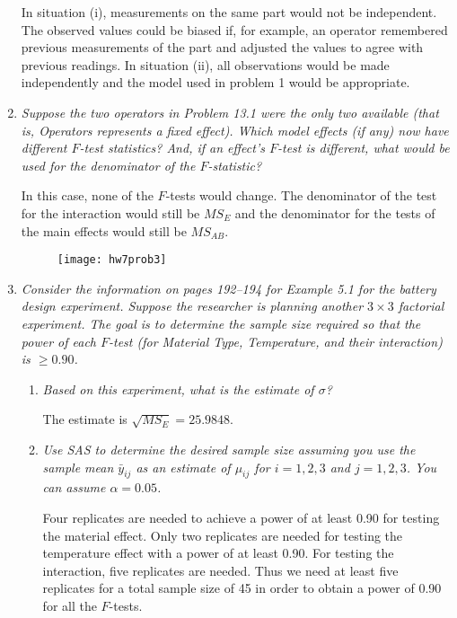 \documentclass[11pt]{article}
\begin{document}
\begin{enumerate}
In situation (i), measurements on the same part would not be independent.
The observed values could be biased if, for example, an operator remembered
previous measurements of the part and adjusted the values to agree with
previous readings. In situation (ii), all observations would be made
independently and the model used in problem 1 would be appropriate.

\item %
{\it Suppose the two operators in Problem 13.1 were the only two available
(that is, Operators represents a fixed effect). Which model effects (if any)
now have different \(F\)-test statistics? And, if an effect's \(F\)-test is
different, what would be used for the denominator of the \(F\)-statistic?}

In this case, none of the \(F\)-tests would change. The denominator of the
test for the interaction would still be \(MS_E\) and the denominator for the
tests of the main effects would still be \(MS_{AB}\).

\begin{figure}[H]\centering
\texttt{[image: hw7prob3]}
\end{figure}

\item %
{\it Consider the information on pages 192--194 for Example 5.1 for the battery
design experiment. Suppose the researcher is planning another \(3\times 3\)
factorial experiment. The goal is to determine the sample size required so
that the power of each \(F\)-test (for Material Type, Temperature, and their
interaction) is \(\geq 0.90\).}

\begin{enumerate}

\item %
{\it Based on this experiment, what is the estimate of \(\sigma\)?}

The estimate is \(\sqrt{MS_E}=25.9848\).

\item %
{\it Use SAS to determine the desired sample size assuming you use the sample
mean \(\bar{y}_{ij}\) as an estimate of \(\mu_{ij}\) for \(i=1,2,3\) and
\(j=1,2,3\). You can assume \(\alpha=0.05\).}

Four replicates are needed to achieve a power of at least 0.90 for testing the
material effect. Only two replicates are needed for testing the temperature
effect with a power of at least 0.90. For testing the interaction, five
replicates are needed. Thus we need at least five replicates for a total sample
size of 45 in order to obtain a power of 0.90 for all the \(F\)-tests.


\end{enumerate}
\end{enumerate}
\end{document}
